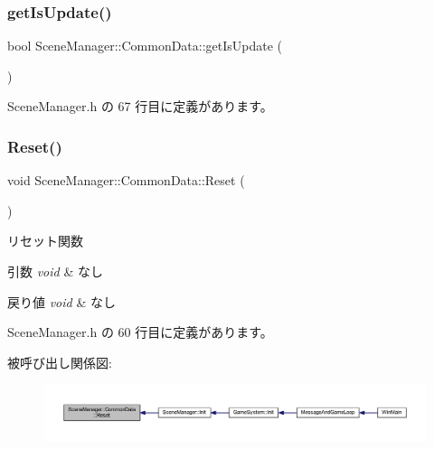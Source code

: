 \subsubsection{\texorpdfstring{get\+Is\+Update()}{getIsUpdate()}}
{\footnotesize\ttfamily bool Scene\+Manager\+::\+Common\+Data\+::get\+Is\+Update (\begin{DoxyParamCaption}{ }\end{DoxyParamCaption})\hspace{0.3cm}{\ttfamily [inline]}}



 Scene\+Manager.\+h の 67 行目に定義があります。

\mbox{\label{class_scene_manager_1_1_common_data_a32823be65c187b909e4159cef57931a9}} 
\subsubsection{\texorpdfstring{Reset()}{Reset()}}
{\footnotesize\ttfamily void Scene\+Manager\+::\+Common\+Data\+::\+Reset (\begin{DoxyParamCaption}{ }\end{DoxyParamCaption})\hspace{0.3cm}{\ttfamily [inline]}}



リセット関数 


\begin{DoxyParams}{引数}
{\em void} & なし \\
\hline
\end{DoxyParams}

\begin{DoxyRetVals}{戻り値}
{\em void} & なし \\
\hline
\end{DoxyRetVals}


 Scene\+Manager.\+h の 60 行目に定義があります。

被呼び出し関係図\+:
\nopagebreak
\begin{figure}[H]
\begin{center}
\leavevmode
\includegraphics[width=350pt]{class_scene_manager_1_1_common_data_a32823be65c187b909e4159cef57931a9_icgraph}
\end{center}
\end{figure}
\mbox{\label{class_scene_manager_1_1_common_data_a63ed55beac6b37243cafdbec26870fc3}} 
